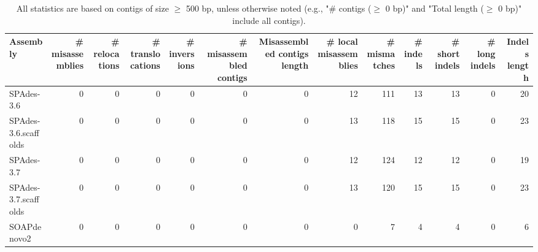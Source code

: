 \documentclass[12pt,a4paper]{article}
\begin{document}
\begin{table}[ht]
\begin{center}
\caption{All statistics are based on contigs of size $\geq$ 500 bp, unless otherwise noted (e.g., "\# contigs ($\geq$ 0 bp)" and "Total length ($\geq$ 0 bp)" include all contigs).}
\begin{tabular}{|l*{12}{|r}|}
\hline
Assembly & \# misassemblies &     \# relocations &     \# translocations &     \# inversions & \# misassembled contigs & Misassembled contigs length & \# local misassemblies & \# mismatches & \# indels &     \# short indels &     \# long indels & Indels length \\ \hline
SPAdes-3.6 & 0 & 0 & 0 & 0 & 0 & 0 & 12 & 111 & 13 & 13 & 0 & 20 \\ \hline
SPAdes-3.6.scaffolds & 0 & 0 & 0 & 0 & 0 & 0 & 13 & 118 & 15 & 15 & 0 & 23 \\ \hline
SPAdes-3.7 & 0 & 0 & 0 & 0 & 0 & 0 & 12 & 124 & 12 & 12 & 0 & 19 \\ \hline
SPAdes-3.7.scaffolds & 0 & 0 & 0 & 0 & 0 & 0 & 13 & 120 & 15 & 15 & 0 & 23 \\ \hline
SOAPdenovo2 & 0 & 0 & 0 & 0 & 0 & 0 & 0 & 7 & 4 & 4 & 0 & 6 \\ \hline
\end{tabular}
\end{center}
\end{table}
\end{document}
